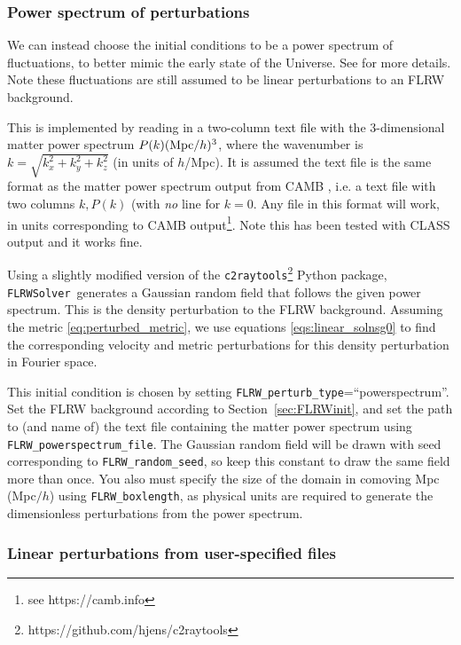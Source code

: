\subsubsection{Power spectrum of perturbations}\label{sec:pspec_ics}

We can instead choose the initial conditions to be a power spectrum of fluctuations, to better mimic the early state of the Universe. See \cite{macpherson2019} for more details. 
Note these fluctuations are still assumed to be linear perturbations to an FLRW background. 

This is implemented by reading in a two-column text file with the 3-dimensional matter power spectrum $P(k) ({\rm Mpc}/h)^3$, where the wavenumber is $k=\sqrt{k_x^2+k_y^2+k_z^2}$ (in units of $h$/Mpc). It is assumed the text file is the same format as the matter power spectrum output from CAMB \cite{lewis2002}, i.e. a text file with two columns $k, P(k)$ (with \emph{no} line for $k=0$. Any file in this format will work, in units corresponding to CAMB output\footnote{see https://camb.info}. Note this has been tested with CLASS output and it works fine.

Using a slightly modified version of the \texttt{c2raytools}\footnote{https://github.com/hjens/c2raytools} Python package, \texttt{FLRWSolver}\ generates a Gaussian random field that follows the given power spectrum. This is the density perturbation to the FLRW background. Assuming the metric \eqref{eq:perturbed_metric}, we use equations \eqref{eqs:linear_solnsg0} to find the corresponding velocity and metric perturbations for this density perturbation in Fourier space.

This initial condition is chosen by setting \texttt{FLRW\_perturb\_type}=``powerspectrum''. Set the FLRW background according to Section~\ref{sec:FLRWinit}, and set the path to (and name of) the text file containing the matter power spectrum using \texttt{FLRW\_powerspectrum\_file}. The Gaussian random field will be drawn with seed corresponding to \texttt{FLRW\_random\_seed}, so keep this constant to draw the same field more than once. You also must specify the size of the domain in comoving Mpc (Mpc$/h$) using \texttt{FLRW\_boxlength}, as physical units are required to generate the dimensionless perturbations from the power spectrum. 


\subsubsection{Linear perturbations from user-specified files}

